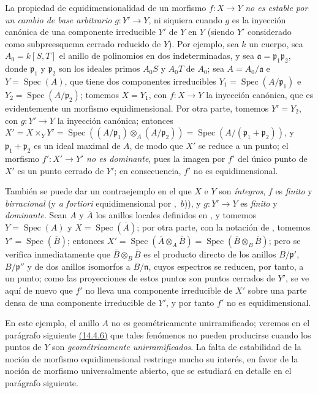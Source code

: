 \begin{remarks}[13.3.9]
\label{IV.13.3.9}
La propiedad de equidimensionalidad de un morfismo $f:X\to Y$ \emph{no es estable por un cambio de base arbitrario} $g:Y'\to Y$, ni siquiera cuando $g$ es la inyección canónica de una componente irreducible $Y'$ de $Y$ en $Y$ (siendo $Y'$
considerado como subpreesquema cerrado reducido de $Y$).
Por ejemplo, sea $k$ un cuerpo, sea $A_0=k[S,T]$ el anillo de polinomios en dos indeterminadas, y sea $\mathfrak a=\mathfrak p_1\mathfrak p_2$, donde $\mathfrak p_1$ y $\mathfrak p_2$ son los ideales primos $A_0S$ y $A_0T$ de $A_0$; sea $A=A_0/\mathfrak a$ e $Y=\operatorname{Spec}(A)$, que tiene dos componentes irreducibles $Y_1=\operatorname{Spec}(A/\mathfrak p_1)$ e $Y_2=\operatorname{Spec}(A/\mathfrak p_2)$; tomemos $X=Y_1$, con $f:X\to Y$ la inyección canónica, que es evidentemente un morfismo equidimensional.
Por otra parte, tomemos $Y'=Y_2$, con $g:Y'\to Y$ la inyección canónica; entonces $X'=X\times_Y Y'=\operatorname{Spec}((A/\mathfrak p_1)\otimes_A
(A/\mathfrak p_2))=\operatorname{Spec}(A/(\mathfrak p_1+\mathfrak p_2))$, y $\mathfrak p_1+\mathfrak p_2$ es un ideal maximal de $A$, de modo que $X'$ se reduce a un punto; el morfismo $f':X'\to Y'$ \emph{no es dominante}, pues la imagen por $f'$ del único punto de $X'$ es un punto cerrado de $Y'$; en consecuencia, $f'$ no es equidimensional.

También se puede dar un contraejemplo en el que $X$ e $Y$ son \emph{íntegros}, $f$ es \emph{finito} y \emph{birracional} (y \emph{a fortiori} equidimensional por ,~$b$)), y $g:Y'\to Y$ es \emph{finito} y \emph{dominante}.
Sean $A$ y $\overline A$ los anillos locales definidos en , y tomemos $Y=\operatorname{Spec}(A)$ y $X=\operatorname{Spec}(\overline A)$; por otra parte, con la notación de , tomemos $Y'=\operatorname{Spec}(\overline B)$; entonces $X'=\operatorname{Spec}(\overline A\otimes_A\overline B)
=\operatorname{Spec}(\overline B\otimes_B\overline B)$; pero se verifica inmediatamente que $\overline B\otimes_B\overline B$ es el producto directo de los anillos $B/\mathfrak p'$, $B/\mathfrak p''$ y de dos anillos isomorfos a $B/\mathfrak n$, cuyos espectros se reducen, por tanto, a un punto; como las proyecciones de estos puntos son puntos cerrados de $Y'$, se ve aquí de nuevo que $f'$ no lleva una componente irreducible de $X'$ sobre una parte densa de una componente irreducible de $Y'$, y por tanto $f'$ no es equidimensional.

En este ejemplo, el anillo $A$ no es geométricamente unirramificado; veremos en el parágrafo siguiente {\hyperlink{ega4.c04.cor.14-4-6}{(14.4.6)}} que tales fenómenos no pueden producirse cuando los puntos de $Y$ son \emph{geométricamente unirramificados}.
La falta de estabilidad de la noción de morfismo equidimensional restringe mucho su interés, en favor de la noción de morfismo universalmente abierto, que se estudiará en detalle en el parágrafo siguiente.
\end{remarks}
